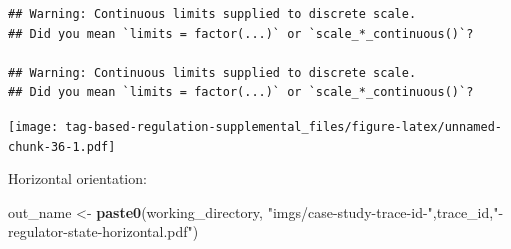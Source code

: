 \documentclass[
]{book}
\newenvironment{Shaded}{\begin{snugshade}}{\end{snugshade}}
\newcommand{\KeywordTok}[1]{\textcolor[rgb]{0.13,0.29,0.53}{\textbf{#1}}}
\newcommand{\NormalTok}[1]{#1}
\newcommand{\StringTok}[1]{\textcolor[rgb]{0.31,0.60,0.02}{#1}}
\begin{document}
\begin{verbatim}
## Warning: Continuous limits supplied to discrete scale.
## Did you mean `limits = factor(...)` or `scale_*_continuous()`?

## Warning: Continuous limits supplied to discrete scale.
## Did you mean `limits = factor(...)` or `scale_*_continuous()`?
\end{verbatim}

\texttt{[image: tag-based-regulation-supplemental\_files/figure-latex/unnamed-chunk-36-1.pdf]}

Horizontal orientation:

\begin{Shaded}
\begin{Highlighting}[]
\NormalTok{out\_name \textless{}{-}}\StringTok{ }\KeywordTok{paste0}\NormalTok{(working\_directory, }\StringTok{"imgs/case{-}study{-}trace{-}id{-}"}\NormalTok{,trace\_id,}\StringTok{"{-}regulator{-}state{-}horizontal.pdf"}\NormalTok{)}


\end{Highlighting}
\end{Shaded}
\end{document}
